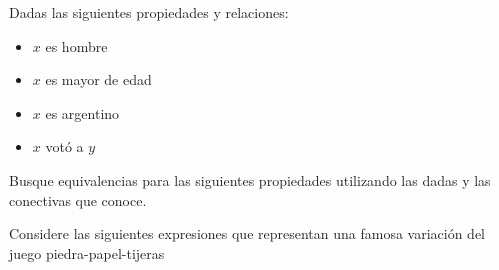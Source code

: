 \documentclass[12pt, addpoints]{../../common/epyl_exam_template}
\begin{document}
\begin{questions}
  \question
    Dadas las siguientes propiedades y relaciones:
    \begin{itemize}
      \item $x$ es hombre
      \item $x$ es mayor de edad
      \item $x$ es argentino
      \item $x$ votó a $y$
    \end{itemize}
    Busque equivalencias para las siguientes propiedades utilizando las dadas y
    las conectivas que conoce.

  \question
    Considere las siguientes expresiones que representan una famosa variación del
    juego piedra-papel-tijeras
    

\end{questions}
\end{document}
